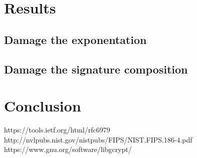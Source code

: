 \documentclass[11pt,english]{article}
\begin{document}
\section{Results}

\subsection{Damage the exponentation}



\subsection{Damage the signature composition}



\section{Conclusion}

\begin{thebibliography}{10}
 https://tools.ietf.org/html/rfc6979
 http://nvlpubs.nist.gov/nistpubs/FIPS/NIST.FIPS.186-4.pdf
https://www.gnu.org/software/libgcrypt/
\end{thebibliography}
\end{document}
